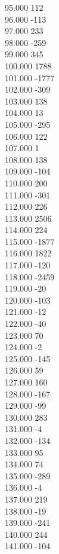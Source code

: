 { 95.000	112 \\
 96.000	-113 \\
 97.000	233 \\
 98.000	-259 \\
 99.000	345 \\
 100.000	1788 \\
 101.000	-1777 \\
 102.000	-309 \\
 103.000	138 \\
 104.000	13 \\
 105.000	-295 \\
 106.000	122 \\
 107.000	1 \\
 108.000	138 \\
 109.000	-104 \\
 110.000	200 \\
 111.000	-301 \\
 112.000	226 \\
 113.000	2506 \\
 114.000	224 \\
 115.000	-1877 \\
 116.000	1822 \\
 117.000	-120 \\
 118.000	-2459 \\
 119.000	-20 \\
 120.000	-103 \\
 121.000	-12 \\
 122.000	-40 \\
 123.000	70 \\
 124.000	-2 \\
 125.000	-145 \\
 126.000	59 \\
 127.000	160 \\
 128.000	-167 \\
 129.000	-99 \\
 130.000	283 \\
 131.000	-4 \\
 132.000	-134 \\
 133.000	95 \\
 134.000	74 \\
 135.000	-289 \\
 136.000	-4 \\
 137.000	219 \\
 138.000	-19 \\
 139.000	-241 \\
 140.000	244 \\
 141.000	-104 \\
}
